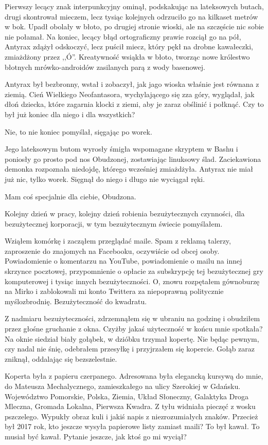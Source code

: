 Pierwszy lecący znak interpunkcyjny ominął, podskakując na lateksowych butach, drugi skontrował mieczem, lecz tysiąc kolejnych odrzuciło go na kilkaset metrów w bok.
Upadł obolały w błoto, po drugiej stronie wioski, ale na szczęście nic sobie nie połamał.
Na koniec, lecący błąd ortograficzny prawie rozciął go na pół, Antyrax zdążył odskoczyć, lecz puścił miecz, który pękł na drobne kawałeczki, zmiażdżony przez ,,Ó''.
Kreatywność wsiąkła w błoto, tworząc nowe królestwo błotnych mrówko-androidów zasilanych parą z wody basenowej.

Antyrax był bezbronny, wstał i zobaczył, jak jago wioska właśnie jest równana z ziemią.
Cień Wielkiego Neofantasora, wychylającego się zza góry, wyglądał, jak dłoń dziecka, które zagarnia klocki z ziemi, aby je zaraz obślinić i połknąć.
Czy to był już koniec dla niego i dla wszystkich?

\ds{} Nie, to nie koniec \dm{} pomyślał, sięgając po worek. \de{}

Jego lateksowym butom wyrosły śmigła wspomagane skryptem w Bashu i poniosły go prosto pod nos Obudzonej, zostawiając linuksowy ślad.
Zaciekawiona demonka rozpoznała niedojdę, którego wcześniej zmiażdżyła.
Antyrax nie miał już nic, tylko worek. Sięgnął do niego i długo nie wyciągał ręki.

\ds{} Mam coś specjalnie dla ciebie, Obudzona. \de{}

\divider{}

\ds{} Kolejny dzień w pracy, kolejny dzień robienia bezużytecznych czynności, dla bezużytecznej korporacji, w tym bezużytecznym świecie \dm{} pomyślałem. \de{}

Wziąłem komórkę i zacząłem przeglądać maile.
Spam z reklamą talerzy, zaproszenie do znajomych na Facebooku, oczywiście od obcej osoby. Powiadomienie o komentarzu na YouTube, 
powiadomienie o mailu na innej skrzynce pocztowej, przypomnienie o opłacie za subskrypcję tej bezużytecznej gry komputerowej i tysiąc innych bezużyteczności.
O, znowu rozpętałem gównoburzę na Mirko i zablokowali mi konto Twittera za niepoprawną politycznie myślozbrodnię.
Bezużyteczność do kwadratu.

Z nadmiaru bezużyteczności, zdrzemnąłem się w ubraniu na godzinę i obudziłem przez głośne gruchanie z okna.
Czyżby jakaś użyteczność w końcu mnie spotkała?
Na oknie siedział biały gołąbek, w dzióbku trzymał kopertę.
Nie będąc pewnym, czy nadal nie śnię, odebrałem przesyłkę i przyjrzałem się kopercie.
Gołąb zaraz zniknął, oddalając się bezszelestnie.

Koperta była z papieru czerpanego.
Adresowana była elegancką kursywą do mnie, do Mateusza Mechalycznego, zamieszkałego na ulicy Szerokiej w Gdańsku. 
Województwo Pomorskie, Polska, Ziemia, Układ Słoneczny, Galaktyka Droga Mleczna, Gromada Lokalna, Pierwsza Kwadra.
Z tyłu widniała pieczęć z wosku pszczelego.
Wypukły obraz kuli i jakiś napis z niezrozumiałych znaków.
Przecież był 2017 rok, kto jeszcze wysyła papierowe listy zamiast maili?
To był kawał. To musiał być kawał. Pytanie jeszcze, jak ktoś go mi wyciął?

